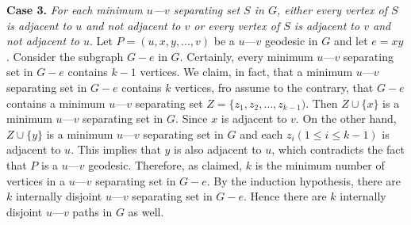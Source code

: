 \vskip 1mm
{\bf Case 3.} {\it For each minimum $u$---$v$ separating set $S$ in $G$, either every vertex of $S$ is adjacent to $u$ and not adjacent to $v$ or every vertex of $S$ is adjacent to $v$ and not adjacent to $u$}. Let $P=(u,x,y, \ldots ,v)$ be a $u$---$v$ geodesic in $G$ and let $e=xy$. Consider the subgraph $G-e$ in $G$. Certainly, every minimum $u$---$v$ separating set in $G-e$ contains $k-1$ vertices. We claim, in fact, that a minimum $u$---$v$ separating set in $G-e$ contains $k$ vertices, fro assume to the contrary, that $G-e$ contains a minimum $u$---$v$ separating set $Z= \lbrace z_1,z_2, \ldots ,z_{k-1})$. Then $Z \cup \lbrace x \rbrace$ is a minimum $u$---$v$ separating set in $G$. Since $x$ is adjacent to $v$. On the other hand, $Z \cup \lbrace y \rbrace$ is a minimum $u$---$v$ separating set in $G$ and each $z_i(1 \leq i \leq k-1)$ is adjacent to $u$. This implies that $y$ is also adjacent to $u$, which contradicts the fact that $P$ is a $u$---$v$ geodesic. Therefore, as claimed, $k$ is the minimum number of vertices in a $u$---$v$ separating set in $G-e$. By the induction hypothesis, there are $k$ internally disjoint $u$---$v$ separating set in $G-e$. Hence there are $k$ internally disjoint $u$---$v$ paths in $G$ as well.

\vfill\eject
